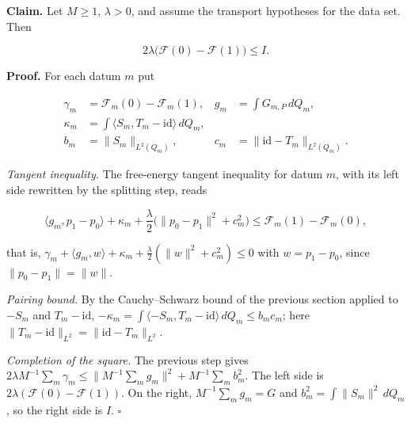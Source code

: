 \documentclass[11pt,a4paper]{report}
\begin{document}
\textbf{Claim.} Let \(M\ge1\), \(\lambda>0\), and assume the transport hypotheses for the data set. Then


\[2\lambda\bigl(\mathcal F(0)-\mathcal F(1)\bigr)\le I.\]


\textbf{Proof.} For each datum \(m\) put


\[\begin{aligned}\gamma_m&=\mathcal F_m(0)-\mathcal F_m(1),&g_m&=\int G_{m,P}\,dQ_m,\\\kappa_m&=\int\langle S_m,T_m-\mathrm{id}\rangle\,dQ_m,\\b_m&=\|S_m\|_{L^2(Q_m)},&c_m&=\|\mathrm{id}-T_m\|_{L^2(Q_m)}.\end{aligned}\]


\emph{Tangent inequality.} The free-energy tangent inequality for datum \(m\), with its left side rewritten by the splitting step, reads


\[\langle g_m,p_1-p_0\rangle+\kappa_m+\frac\lambda2\bigl(\|p_0-p_1\|^2+c_m^2\bigr)\le\mathcal F_m(1)-\mathcal F_m(0),\]


that is, \(\gamma_m+\langle g_m,w\rangle+\kappa_m+\frac\lambda2(\|w\|^2+c_m^2)\le0\) with \(w=p_1-p_0\), since \(\|p_0-p_1\|=\|w\|\).




\emph{Pairing bound.} By the Cauchy–Schwarz bound of the previous section applied to \(-S_m\) and \(T_m-\mathrm{id}\), \(-\kappa_m=\int\langle-S_m,T_m-\mathrm{id}\rangle\,dQ_m\le b_mc_m\); here \(\|T_m-\mathrm{id}\|_{L^2}=\|\mathrm{id}-T_m\|_{L^2}\).




\emph{Completion of the square.} The previous step gives \(2\lambda M^{-1}\sum_m\gamma_m\le\|M^{-1}\sum_mg_m\|^2+M^{-1}\sum_mb_m^2\). The left side is \(2\lambda(\mathcal F(0)-\mathcal F(1))\). On the right, \(M^{-1}\sum_mg_m=G\) and \(b_m^2=\int\|S_m\|^2\,dQ_m\), so the right side is \(I\). \(\square\)
\end{document}
